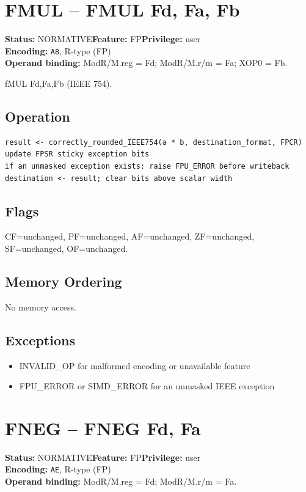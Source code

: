 \documentclass[10pt]{article}
\begin{document}
\section{FMUL -- FMUL Fd, Fa, Fb}
\textbf{Status:} NORMATIVE\quad \textbf{Feature:} FP\quad \textbf{Privilege:} user\\
\textbf{Encoding:} \texttt{A8}, R-type (FP)\\
\textbf{Operand binding:} ModR/M.reg = Fd; ModR/M.r/m = Fa; XOP0 = Fb.

fMUL Fd,Fa,Fb (IEEE 754).

\subsection*{Operation}
\begin{lstlisting}
result <- correctly_rounded_IEEE754(a * b, destination_format, FPCR)
update FPSR sticky exception bits
if an unmasked exception exists: raise FPU_ERROR before writeback
destination <- result; clear bits above scalar width
\end{lstlisting}
\subsection*{Flags}
CF=unchanged, PF=unchanged, AF=unchanged, ZF=unchanged, SF=unchanged, OF=unchanged.
\subsection*{Memory Ordering}
No memory access.
\subsection*{Exceptions}
\begin{itemize}
\item INVALID\_OP for malformed encoding or unavailable feature
\item FPU\_ERROR or SIMD\_ERROR for an unmasked IEEE exception
\end{itemize}
\clearpage

\section{FNEG -- FNEG Fd, Fa}
\textbf{Status:} NORMATIVE\quad \textbf{Feature:} FP\quad \textbf{Privilege:} user\\
\textbf{Encoding:} \texttt{AE}, R-type (FP)\\
\textbf{Operand binding:} ModR/M.reg = Fd; ModR/M.r/m = Fa.
\end{document}
